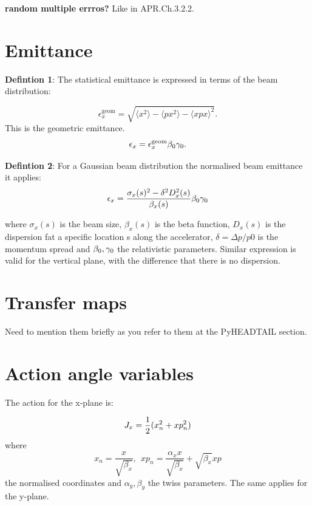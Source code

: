 {{\textbf{random multiple errros? } Like in APR.Ch.3.2.2.


\section{Emittance}

\textbf{Defintion 1}: The statistical emittance is expressed in terms of the beam distribution: %

\begin{equation}\label{eq:statistical_definition_emit}
    \epsilon_x^{\mathrm{geom}} = \sqrt{\langle x^2 \rangle - \langle px^2 \rangle - \langle x px \rangle^2}.
\end{equation}
This is the geometric emittance. 
\begin{equation}\label{eq:emit_geom_norm_relation}
    \epsilon_x = \epsilon_x^{\mathrm{geom}} {\beta_0} {\gamma_0}.
\end{equation}


\textbf{Defintion 2}:
For a Gaussian beam distribution the normalised beam emittance it applies:
\begin{equation}\label{eq:emit_from_beam_size}
    \epsilon_{x} = \frac{\sigma_x(s)^2 - \delta^2 D_x^2(s)}{\beta_x(s)} {\beta_0} {\gamma_0}
\end{equation}

where $\sigma_x(s)$ is the beam size, $\beta_x(s)$ is the beta function, $D_x(s)$ is the dispersion fat a specific location s along the accelerator, $\delta=\Delta p/p0$ is the momentum spread and ${\beta_0}, {\gamma_0}$ the relativistic parameters. Similar expression is valid for the vertical plane, with the difference that there is no dispersion.

\section{Transfer maps}
Need to mention them briefly as you refer to them at the PyHEADTAIL section.

\section{Action angle variables}
The action for the x-plane is:

\begin{equation}\label{eq:action}
    {J_x} = \frac{1}{2}(x_n^2 +xp^2_n) 
\end{equation}
where 
\begin{equation}\label{normalised_y}
    x_n = \frac{x}{\sqrt{\beta_x}}, \ \ xp_n = \frac{\alpha_x x}{\sqrt{\beta_x}} + \sqrt{\beta_x}xp
\end{equation}
the normalised coordinates and $\alpha_y, \beta_y$ the twiss parameters. 
The same applies for the y-plane. 

}}

